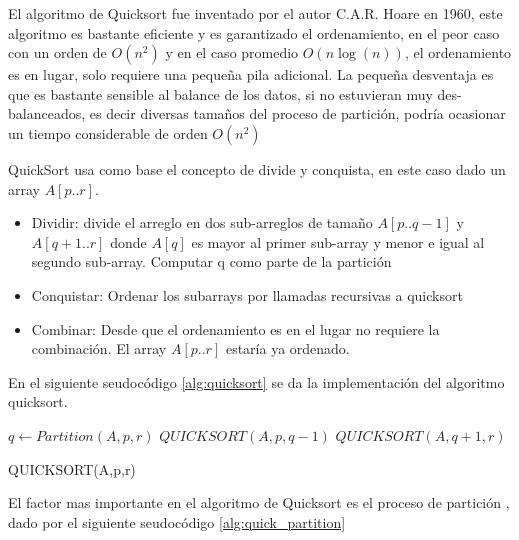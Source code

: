 \documentclass{article}
\begin{document}
    		        El algoritmo de Quicksort fue inventado por el autor C.A.R. Hoare en 1960, este algoritmo es bastante eficiente y es garantizado el ordenamiento, en el peor caso con un orden de $O(n^2)$ y en el caso promedio $O(n\log(n))$, el ordenamiento es en lugar, solo requiere una pequeña pila adicional.
    		        La peque\~{n}a desventaja es que es bastante sensible al balance de los datos, si no estuvieran muy des-balanceados, es decir diversas tama\~{n}os del proceso de partici\'{o}n, podr\'{i}a ocasionar un tiempo considerable de orden $O(n^2)$
    		         
    		        QuickSort usa como base el concepto de divide y conquista, en este caso dado un array $A[p..r]$.
    		        
    		        \begin{itemize}
    		            \item Dividir: divide el arreglo en dos sub-arreglos de tama\~{n}o $A[p..q-1]$ y $A[q+1..r]$ donde $A[q]$ es mayor al primer sub-array y menor e igual al segundo sub-array. Computar q como parte de la partici\'{o}n
    		            \item Conquistar: Ordenar los subarrays por llamadas recursivas a quicksort
    		            \item Combinar: Desde que el ordenamiento es en el lugar no requiere la combinación. El array $A[p..r]$ estar\'{i}a ya ordenado.
    		        \end{itemize}
    		        
    		        En el siguiente seudoc\'{o}digo \ref{alg:quicksort} se da la implementaci\'{o}n del algoritmo quicksort.
    		        
    		        \begin{algorithm}[H]
                        \begin{algorithmic}[1]
                                \STATE $q \leftarrow Partition(A,p,r)$
                                \STATE $QUICKSORT(A,p,q-1)$
                                \STATE $QUICKSORT(A,q+1,r)$
                            \ENDIF
                        \end{algorithmic}
                        \caption{QUICKSORT(A,p,r)}
                        \label{alg:quicksort}
                    \end{algorithm}
                    
                    El factor mas importante en el algoritmo de Quicksort es el proceso de partici\'{o}n , dado por el siguiente seudoc\'{o}digo \ref{alg:quick_partition}
                    
\end{document}
